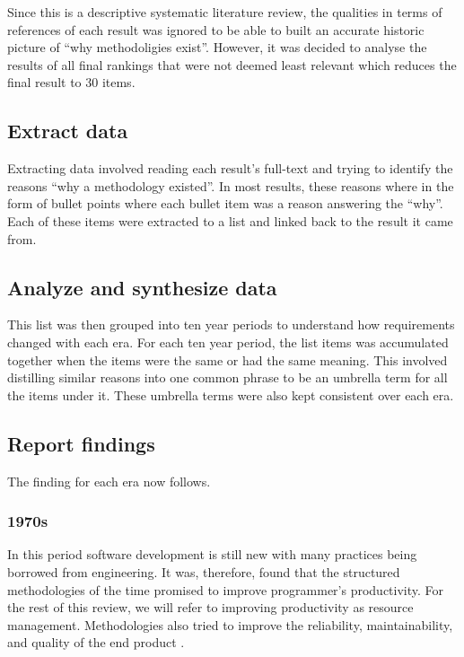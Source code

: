 Since this is a descriptive systematic literature review, the qualities in terms of references of each result was ignored to be able to built an accurate historic picture of ``why methodoligies exist''.
However, it was decided to analyse the results of all final rankings that were not deemed least relevant which reduces the final result to 30 items.

\subsection{Extract data}
Extracting data involved reading each result's full-text and trying to identify the reasons ``why a methodology existed''.
In most results, these reasons where in the form of bullet points where each bullet item was a reason answering the ``why''.
Each of these items were extracted to a list and linked back to the result it came from.

\subsection{Analyze and synthesize data}
This list was then grouped into ten year periods to understand how requirements changed with each era.
For each ten year period, the list items was accumulated together when the items were the same or had the same meaning.
This involved distilling similar reasons into one common phrase to be an umbrella term for all the items under it.
These umbrella terms were also kept consistent over each era.


\subsection{Report findings}
The finding for each era now follows. 

\subsubsection{1970s}
In this period software development is still new with many practices being borrowed from engineering.
It was, therefore, found that the structured methodologies of the time promised to improve programmer's productivity.
For the rest of this review, we will refer to improving productivity as resource management.
Methodologies also tried to improve the reliability, maintainability, and quality of the end product \cite{yourdon_1977}.

